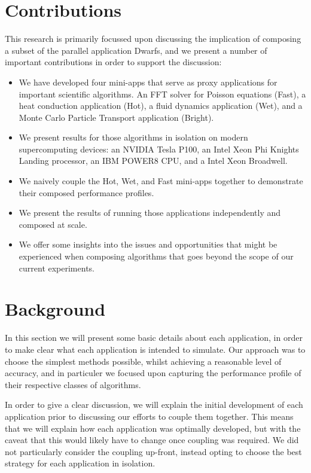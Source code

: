 \documentclass[runningheads,a4paper]{llncs}
\begin{document}
\section{Contributions}

This research is primarily focussed upon discussing the implication of composing a subset of the parallel application Dwarfs, and we present a number of important contributions in order to support the discussion:

\begin{itemize}
  \item We have developed four mini-apps that serve as proxy applications for important scientific algorithms. An FFT solver for Poisson equations (Fast), a heat conduction application (Hot), a fluid dynamics application (Wet), and a Monte Carlo Particle Transport application (Bright).

\item We present results for those algorithms in isolation on modern supercomputing devices: an NVIDIA Tesla P100, an Intel Xeon Phi Knights Landing processor, an IBM POWER8 CPU, and a Intel Xeon Broadwell.

\item We naively couple the Hot, Wet, and Fast mini-apps together to demonstrate their composed performance profiles.

  \item We present the results of running those applications independently and composed at scale.

    \item We offer some insights into the issues and opportunities that might be experienced when composing algorithms that goes beyond the scope of our current experiments.

\end{itemize}

\section{Background}

In this section we will present some basic details about each application, in order to make clear what each application is intended to simulate. Our approach was to choose the simplest methods possible, whilst achieving a reasonable level of accuracy, and in particuler we focused upon capturing the performance profile of their respective classes of algorithms.

In order to give a clear discussion, we will explain the initial development of each application prior to discussing our efforts to couple them together. This means that we will explain how each application was optimally developed, but with the caveat that this would likely have to change once coupling was required. We did not particularly consider the coupling up-front, instead opting to choose the best strategy for each application in isolation.
\end{document}
